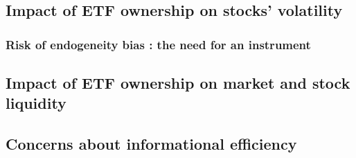 \subsection{Impact of ETF ownership on stocks' volatility}

\subsubsection{Risk of endogeneity bias : the need for an instrument}
\subsection{Impact of ETF ownership on market and stock liquidity}

\subsection{Concerns about informational efficiency}
